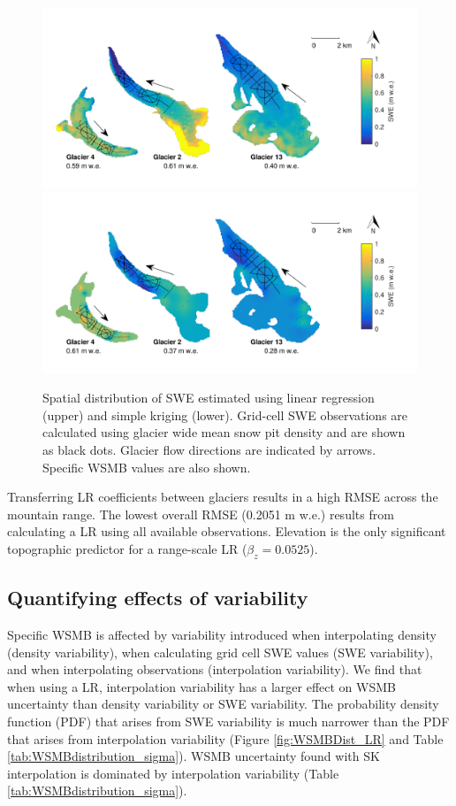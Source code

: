 \documentclass[twocolumn,letterpaper]{igs}
\begin{document}
\begin{figure}
	\centering
	\includegraphics[width =\textwidth]{LR_map.pdf}\\
    \includegraphics[width =\textwidth]{SK_map.pdf}\\
	\caption{Spatial distribution of SWE estimated using linear regression (upper) and simple kriging (lower). Grid-cell SWE observations are calculated using glacier wide mean snow pit density and are shown as black dots. Glacier flow directions are indicated by arrows. Specific WSMB values are also shown.}
	\label{fig:LR_SK_map}
\end{figure}

Transferring LR coefficients between glaciers results in a high RMSE across the mountain range. The lowest overall RMSE (0.2051 m w.e.) results from calculating a LR using all available observations. Elevation is the only significant topographic predictor for a range-scale LR ($\beta_z=0.0525$).


\subsection{Quantifying effects of variability}

Specific WSMB is affected by variability introduced when interpolating density (density variability), when calculating grid cell SWE values (SWE variability), and when interpolating observations (interpolation variability). We find that when using a LR, interpolation variability has a larger effect on WSMB uncertainty than density variability or SWE variability. The probability density function (PDF) that arises from SWE variability is much narrower than the PDF that arises from interpolation variability (Figure \ref{fig:WSMBDist_LR} and Table \ref{tab:WSMBdistribution_sigma}). WSMB uncertainty found with SK interpolation is dominated by interpolation variability (Table \ref{tab:WSMBdistribution_sigma}).  
\end{document}
